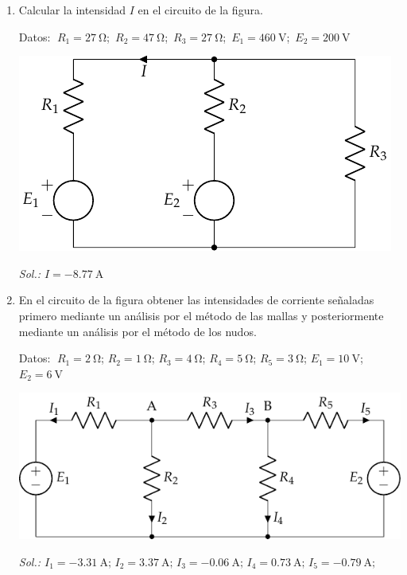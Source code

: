 \begin{enumerate}
\item Calcular la intensidad $I$ en el circuito de la figura.

    Datos: $\; R_1 = \qty{27}{\ohm}$;\, $R_2 = \qty{47}{\ohm}$;\, $R_3 = \qty{27}{\ohm}$;\, $E_1 = \qty{460}{\volt}$;\, $E_2 = \qty{200}{\volt}$
    
  \begin{center}
    \includegraphics{../figs/ej4_BT1.pdf}
  \end{center}

  \emph{Sol.:\; $I=\qty{-8.77}{\ampere}$}
		
\item En el circuito de la figura obtener las intensidades de
  corriente señaladas primero mediante un análisis por el método de
  las mallas y posteriormente mediante un análisis por el método de
  los nudos.

  Datos: $\; R_1 = \qty{2}{\ohm}$; $R_2 = \qty{1}{\ohm}$; $R_3 = \qty{4}{\ohm}$; $R_4 = \qty{5}{\ohm}$; $R_5 = \qty{3}{\ohm}$; $E_1 = \qty{10}{\volt}$; $E_2 = \qty{6}{\volt}$
  
  \begin{center}
    \includegraphics{../figs/ej8_BT1.pdf}
  \end{center}

  \emph{Sol.:\;
    $I_1=\qty{-3.31}{\ampere};\, I_2=\qty{3.37}{\ampere};\, I_3=\qty{-0.06}{\ampere};\, 
    I_4=\qty{0.73}{\ampere};\,  I_5=\qty{-0.79}{\ampere};\, $}
 	

\end{enumerate}
